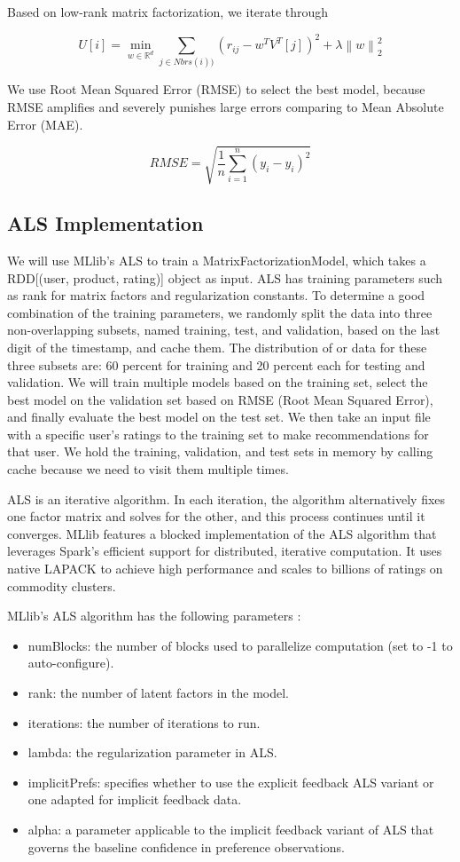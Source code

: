 \documentclass[conference]{IEEEtran}
\begin{document}
Based on low-rank matrix factorization, we iterate through

$$U[i] = \min_{w \in \mathbb{R}^d} \sum_{j \in Nbrs(i))} (r_{ij} - w^TV^T[j])^2 + \lambda \left \| w \right \|^2_2$$


We use Root Mean Squared Error (RMSE) to select the best model, because RMSE amplifies and severely punishes large errors comparing to Mean Absolute Error (MAE). 

$$RMSE = \sqrt{\frac{1}{n} \sum_{i=1}^{n}(y_i - \hat{y_i})^2}$$

\subsection{ALS Implementation}

We will use MLlib’s ALS to train a MatrixFactorizationModel, which takes a RDD[(user, product, rating)] object as input. ALS has training parameters such as rank for matrix factors and regularization constants. To determine a good combination of the training parameters, we randomly split the data into three non-overlapping subsets, named training, test, and validation, based on the last digit of the timestamp, and cache them.  The distribution of or data for these three subsets are: 60 percent for training and 20 percent each for testing and validation.  We will train multiple models based on the training set, select the best model on the validation set based on RMSE (Root Mean Squared Error), and finally evaluate the best model on the test set. We then take an input file with a specific user's ratings to the training set to make recommendations for that user. We hold the training, validation, and test sets in memory by calling cache because we need to visit them multiple times.

ALS is an iterative algorithm. In each iteration, the algorithm alternatively fixes one factor matrix and solves for the other, and this process continues until it converges. MLlib features a blocked implementation of the ALS algorithm that leverages Spark’s efficient support for distributed, iterative computation. It uses native LAPACK to achieve high performance and scales to billions of ratings on commodity clusters. 

MLlib's ALS algorithm has the following parameters \cite{ApacheSpark}:

\begin{itemize}
    \item numBlocks: the number of blocks used to parallelize computation (set to -1 to auto-configure).
    \item rank: the number of latent factors in the model.
    \item iterations: the number of iterations to run.
    \item lambda: the regularization parameter in ALS.
    \item implicitPrefs: specifies whether to use the explicit feedback ALS variant or one adapted for implicit feedback data.
    \item alpha: a parameter applicable to the implicit feedback variant of ALS that governs the baseline confidence in preference observations.
\end{itemize}
\end{document}
